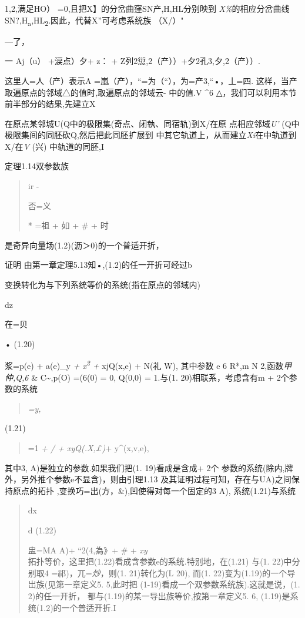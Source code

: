 \documentclass{article}
\begin{document}
1,2,满足HO） =0,且把X】的分岔曲窪SN产,H\textbar{},HL\textbar{}分别映到
\emph{X\%}的相应分岔曲线SN?,H\textsubscript{a},HL\textsubscript{2}.因此，代替X''可考虑系统族
（X/）"

---了，

一 Aj（u） +涙点）夕+ z： + Z列2愆,2（产））+夕2孔3,夕,2（产））.

这里人=人（产）表示A =嵐（产），``=为（``），为=产3,``•，丄=四.
这样，当产取遍原点的邻域△的值时,取遍原点的邻域云- 中的值.V \^{}6
△，我们可以利用本节前半部分的结果,先建立X

在原点某邻城U(Q中的极限集(奇点、闭執、同宿轨)到X/在原
点相应邻域\emph{U'} (Q中极限集间的同胚砍Q,然后把此同胚扩展到
中其它轨道上，从而建立\emph{Xi}在中轨道到X/在\emph{V} (兴)
中轨道的同胚,I

定理1.14双参数族

\begin{quote}
ir -

否=义

* =祖 + 如 + \# + 时
\end{quote}

是奇异向量场(1.2)(沥＞0)的一个普适开折，

证明 由第一章定理5.13知•,(1.2)的任一开折可经过b

变换转化为与下列系统等价的系统(指在原点的邻域内)

dz

在=贝

• (1.20)

浆=p(e) + a(e)\_y \emph{+ x\textsuperscript{2} +} xjQ(x,e) + N(礼 W),
其中参数 e 6 R*,m N 2,函数\emph{甲仲,Q,6} \& C\textasciitilde{},p(O)
=(6(0) = 0, Q(0,0) = 1.与(1. 20)相联系，考虑含有m + 2个参数的系统

\begin{quote}
\emph{=y,}
\end{quote}

(1.21)

\begin{quote}
=1 \emph{+ / + xyQ(.X,£)}+ y\^{}(x,v,e),
\end{quote}

其中3, A)是独立的参数.如果我们把(1. 19)看成是含成+ 2个
参数的系统(除内,牌外，另外推个参数e不显含)，则由引理1.13
及其证明过程可知，存在与UA)之间保持原点的拓扑
,变换巧=出(方，\&),凹使得对每一个固定的3 A), 系统(1.21)与系统

\begin{quote}
dx

d (1.22)

盅=MA A)+ ``2(4,為》+ \# + \emph{xy\\
}拓扑等价，这里把(1.22)看成含参数e的系统.特别地，在(1.21) 与(1.
22)中分别取4 =祁)，兀=\emph{炒}，则(1. 21)转化为(L 20), 而(1.
22)变为(1.19)的一个导岀族(见第一章定义5. 5,此时把
(1-19)看成一个双参数系统族).这就是说，(1. 2)的任一开折，
都与(1.19)的某一导出族等价,按第一章定义5. 6, (1.19)是系
统(1.2)的一个普适开折.I
\end{quote}
\end{document}
